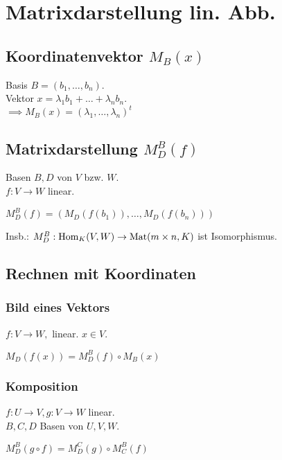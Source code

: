 \section*{Matrixdarstellung lin. Abb.}

\subsection*{Koordinatenvektor $M_B(x)$}
Basis $B=(b_1,\dots,b_n)$.\\
Vektor $x=\lambda_1 b_1+\dots+\lambda_n b_n$. \\
$\implies M_B(x) = (\lambda_1,\dots,\lambda_n)^t$

\subsection*{Matrixdarstellung $M_D^B(f)$}
Basen $B,D$ von $V$ bzw. $W$. \\
$f:V\to W$ linear.

$M_D^B(f)=(M_D(f(b_1)),\dots,M_D(f(b_n)))$

Insb.: $M_D^B: \operatorname{Hom}_K(V,W) \to \operatorname{Mat}(m \times n, K)$
ist Isomorphismus.

\subsection*{Rechnen mit Koordinaten}
\subsubsection*{Bild eines Vektors}
$f: V\to W, $ linear. $x\in V$.

$M_D(f(x))=M_D^B(f) \circ M_B(x)$

\subsubsection*{Komposition}
$f: U\to V, g: V\to W$ linear. \\
$B,C,D$ Basen von $U,V,W$.

$M_D^B(g \circ f) = M_D^C(g) \circ M^B_C(f)$
